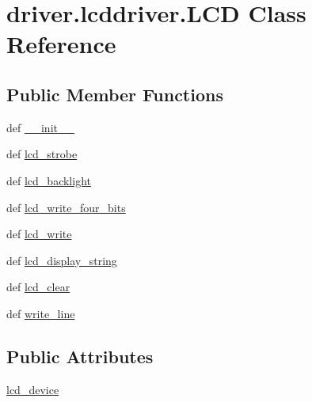 \hypertarget{classdriver_1_1lcddriver_1_1LCD}{}\section{driver.\+lcddriver.\+L\+C\+D Class Reference}
\label{classdriver_1_1lcddriver_1_1LCD}
\subsection*{Public Member Functions}
\begin{DoxyCompactItemize}
\item 
def \hyperlink{classdriver_1_1lcddriver_1_1LCD_a64d4c8185093f73c7c5ab6979396ed8c}{\+\_\+\+\_\+init\+\_\+\+\_\+}
\item 
def \hyperlink{classdriver_1_1lcddriver_1_1LCD_a596a7bb9c9fa633b6e5890886f40a07f}{lcd\+\_\+strobe}
\item 
def \hyperlink{classdriver_1_1lcddriver_1_1LCD_ab01c3cddd70d0812a0703aa65eede3e4}{lcd\+\_\+backlight}
\item 
def \hyperlink{classdriver_1_1lcddriver_1_1LCD_abbda7dc71e106248dd905d4a2b14c935}{lcd\+\_\+write\+\_\+four\+\_\+bits}
\item 
def \hyperlink{classdriver_1_1lcddriver_1_1LCD_a27bd6dcf5856e68ef269a70ca6d8557d}{lcd\+\_\+write}
\item 
def \hyperlink{classdriver_1_1lcddriver_1_1LCD_a0458faa2d341063ea03b2124fe8166df}{lcd\+\_\+display\+\_\+string}
\item 
def \hyperlink{classdriver_1_1lcddriver_1_1LCD_aca18a41a4d0e8c71dd5e8f908dc51329}{lcd\+\_\+clear}
\item 
def \hyperlink{classdriver_1_1lcddriver_1_1LCD_a7fffd68b641188b78a2876d5f04810db}{write\+\_\+line}
\end{DoxyCompactItemize}
\subsection*{Public Attributes}
\begin{DoxyCompactItemize}
\item 
\hyperlink{classdriver_1_1lcddriver_1_1LCD_acb52d8faa24a5c08b5d12fba91094d79}{lcd\+\_\+device}
\end{DoxyCompactItemize}
